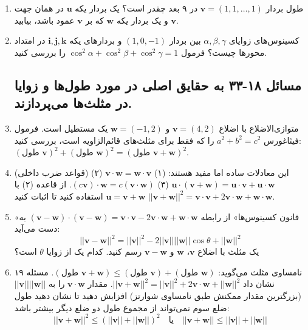 \documentclass[12pt, a4paper]{book}
\begin{document}
\begin{enumerate}
		\item طول بردار $\mathbf{v}=(1,1,\dots,1)$ در ۹ بعد چقدر است؟ یک بردار یکه $\mathbf{u}$ در همان جهت $\mathbf{v}$ و یک بردار یکه $\mathbf{w}$ که بر $\mathbf{v}$ عمود باشد، بیابید.
		\item کسینوس‌های زوایای $\alpha, \beta, \gamma$ بین بردار $(1,0,-1)$ و بردارهای یکه $\mathbf{i, j, k}$ در امتداد محورها چیست؟ فرمول $\cos^2\alpha + \cos^2\beta + \cos^2\gamma = 1$ را بررسی کنید.
		
		\subsection*{مسائل ۱۸-۳۳ به حقایق اصلی در مورد طول‌ها و زوایا در مثلث‌ها می‌پردازند.}
		
		\item متوازی‌الاضلاع با اضلاع $\mathbf{v}=(4,2)$ و $\mathbf{w}=(-1,2)$ یک مستطیل است. فرمول فیثاغورس $a^2+b^2=c^2$ را که فقط برای مثلث‌های قائم‌الزاویه است، بررسی کنید: $(\text{طول } \mathbf{v})^2 + (\text{طول } \mathbf{w})^2 = (\text{طول } \mathbf{v}+\mathbf{w})^2$.
		\item (قواعد ضرب داخلی) این معادلات ساده اما مفید هستند: (۱) $\mathbf{v}\cdot\mathbf{w}=\mathbf{w}\cdot\mathbf{v}$ (۲) $\mathbf{u}\cdot(\mathbf{v}+\mathbf{w}) = \mathbf{u}\cdot\mathbf{v}+\mathbf{u}\cdot\mathbf{w}$ (۳) $(c\mathbf{v})\cdot\mathbf{w} = c(\mathbf{v}\cdot\mathbf{w})$. از قاعده (۲) با $\mathbf{u}=\mathbf{v}+\mathbf{w}$ استفاده کنید تا اثبات کنید $||\mathbf{v}+\mathbf{w}||^2 = \mathbf{v}\cdot\mathbf{v} + 2\mathbf{v}\cdot\mathbf{w} + \mathbf{w}\cdot\mathbf{w}$.
		\item «قانون کسینوس‌ها» از رابطه $(\mathbf{v}-\mathbf{w})\cdot(\mathbf{v}-\mathbf{w}) = \mathbf{v}\cdot\mathbf{v}-2\mathbf{v}\cdot\mathbf{w}+\mathbf{w}\cdot\mathbf{w}$ به دست می‌آید:
		\[ ||\mathbf{v}-\mathbf{w}||^2 = ||\mathbf{v}||^2 - 2||\mathbf{v}||||\mathbf{w}||\cos\theta + ||\mathbf{w}||^2 \]
		یک مثلث با اضلاع $\mathbf{v}$، $\mathbf{w}$ و $\mathbf{v}-\mathbf{w}$ رسم کنید. کدام یک از زوایا $\theta$ است؟
		\item نامساوی مثلث می‌گوید: $(\text{طول } \mathbf{v}+\mathbf{w}) \le (\text{طول } \mathbf{v}) + (\text{طول } \mathbf{w})$. مسئله ۱۹ نشان داد $||\mathbf{v}+\mathbf{w}||^2 = ||\mathbf{v}||^2 + 2\mathbf{v}\cdot\mathbf{w} + ||\mathbf{w}||^2$. مقدار $\mathbf{v}\cdot\mathbf{w}$ را به $||\mathbf{v}||||\mathbf{w}||$ (بزرگترین مقدار ممکنش طبق نامساوی شوارتز) افزایش دهید تا نشان دهید طول ضلع سوم نمی‌تواند از مجموع طول دو ضلع دیگر بیشتر باشد:
		\[ ||\mathbf{v}+\mathbf{w}||^2 \le (||\mathbf{v}||+||\mathbf{w}||)^2 \quad \text{یا} \quad ||\mathbf{v}+\mathbf{w}|| \le ||\mathbf{v}||+||\mathbf{w}|| \]

\end{enumerate}
\end{document}
